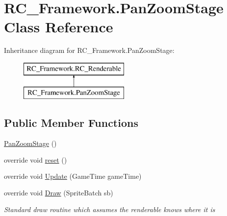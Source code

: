 \hypertarget{class_r_c___framework_1_1_pan_zoom_stage}{}\section{R\+C\+\_\+\+Framework.\+Pan\+Zoom\+Stage Class Reference}
\label{class_r_c___framework_1_1_pan_zoom_stage}
Inheritance diagram for R\+C\+\_\+\+Framework.\+Pan\+Zoom\+Stage\+:\begin{figure}[H]
\begin{center}
\leavevmode
\includegraphics[height=2.000000cm]{class_r_c___framework_1_1_pan_zoom_stage}
\end{center}
\end{figure}
\subsection*{Public Member Functions}
\begin{DoxyCompactItemize}
\item 
\mbox{\hyperlink{class_r_c___framework_1_1_pan_zoom_stage_a2c71701559175b11b3d05c34834d9c18}{Pan\+Zoom\+Stage}} ()
\item 
override void \mbox{\hyperlink{class_r_c___framework_1_1_pan_zoom_stage_a9dc8dc75dab537e608713543ca314284}{reset}} ()
\item 
override void \mbox{\hyperlink{class_r_c___framework_1_1_pan_zoom_stage_a8463539aad705ab51a1ee3b7a64d3f35}{Update}} (Game\+Time game\+Time)
\item 
override void \mbox{\hyperlink{class_r_c___framework_1_1_pan_zoom_stage_a399538cd702d22cb14394f73b1bccff6}{Draw}} (Sprite\+Batch sb)
\begin{DoxyCompactList}\small\item\em Standard draw routine which assumes the renderable knows where it is \end{DoxyCompactList}\end{DoxyCompactItemize}
